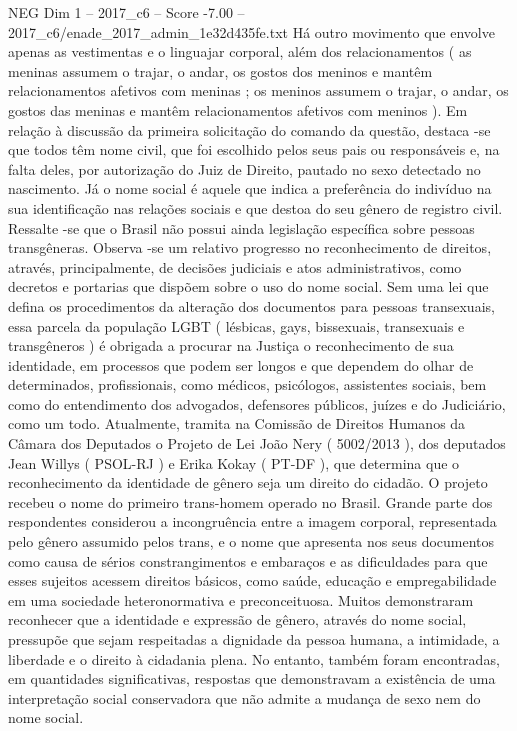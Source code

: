 \begin{textsample}{NEG Dim 1 – 2017\_c6 – Score -7.00 – 2017\_c6/enade\_2017\_admin\_1e32d435fe.txt}
Há outro movimento que envolve apenas as vestimentas e o linguajar corporal, além dos relacionamentos ( as meninas assumem o trajar, o andar, os gostos dos meninos e mantêm relacionamentos afetivos com meninas ; os meninos assumem o trajar, o andar, os gostos das meninas e mantêm relacionamentos afetivos com meninos ).
Em relação à discussão da primeira solicitação do comando da questão, destaca -se que todos têm nome civil, que foi escolhido pelos seus pais ou responsáveis e, na falta deles, por autorização do Juiz de Direito, pautado no sexo detectado no nascimento.
Já o nome social é aquele que indica a preferência do indivíduo na sua identificação nas relações sociais e que destoa do seu gênero de registro civil.
Ressalte -se que o Brasil não possui ainda legislação específica sobre pessoas transgêneras.
Observa -se um relativo progresso no reconhecimento de direitos, através, principalmente, de decisões judiciais e atos administrativos, como decretos e portarias que dispõem sobre o uso do nome social.
Sem uma lei que defina os procedimentos da alteração dos documentos para pessoas transexuais, essa parcela da população LGBT ( lésbicas, gays, bissexuais, transexuais e transgêneros ) é obrigada a procurar na Justiça o reconhecimento de sua identidade, em processos que podem ser longos e que dependem do olhar de determinados, profissionais, como médicos, psicólogos, assistentes sociais, bem como do entendimento dos advogados, defensores públicos, juízes e do Judiciário, como um todo.
Atualmente, tramita na Comissão de Direitos Humanos da Câmara dos Deputados o Projeto de Lei João Nery ( 5002/2013 ), dos deputados Jean Willys ( PSOL-RJ ) e Erika Kokay ( PT-DF ), que determina que o reconhecimento da identidade de gênero seja um direito do cidadão.
O projeto recebeu o nome do primeiro trans-homem operado no Brasil.
Grande parte dos respondentes considerou a incongruência entre a imagem corporal, representada pelo gênero assumido pelos trans, e o nome que apresenta nos seus documentos como causa de sérios constrangimentos e embaraços e as dificuldades para que esses sujeitos acessem direitos básicos, como saúde, educação e empregabilidade em uma sociedade heteronormativa e preconceituosa.
Muitos demonstraram reconhecer que a identidade e expressão de gênero, através do nome social, pressupõe que sejam respeitadas a dignidade da pessoa humana, a intimidade, a liberdade e o direito à cidadania plena.
No entanto, também foram encontradas, em quantidades significativas, respostas que demonstravam a existência de uma interpretação social conservadora que não admite a mudança de sexo nem do nome social.

\end{textsample}
